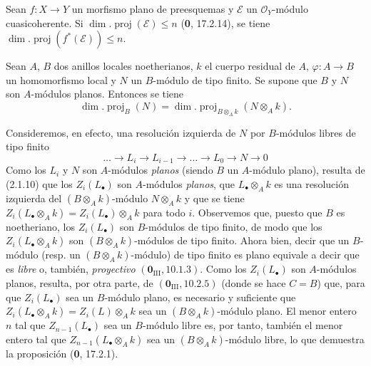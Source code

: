 \begin{corollary}[6.2.2]
\label{IV.2.s6.2.2-fr}
Sean $f:X\to Y$ un morfismo plano de preesquemas y $\mathscr E$ un
$\mathcal O_Y$-módulo cuasicoherente. Si
$\dim.\operatorname{proj}(\mathscr E)\leq n$ \textup{(\textbf{0}, 17.2.14)}, se tiene
$\dim.\operatorname{proj}(f^*(\mathscr E))\leq n$.
\end{corollary}


\begin{proposition}[6.2.3]
Sean $A$, $B$ dos anillos locales noetherianos, $k$ el cuerpo residual de
$A$, $\varphi:A\to B$ un homomorfismo local y $N$ un $B$-módulo de tipo finito.
Se supone que $B$ y $N$ son $A$-módulos planos. Entonces se tiene
\begin{equation}
\dim.\operatorname{proj}_B(N)
=\dim.\operatorname{proj}_{B\otimes_Ak}(N\otimes_Ak).
\tag{6.2.3.1}\label{IV.2.s6.2.3.1-fr}
\end{equation}
\end{proposition}

Consideremos, en efecto, una resolución izquierda de $N$ por $B$-módulos
libres de tipo finito
\[
\ldots\to L_i\to L_{i-1}\to\ldots\to L_0\to N\to0
\]
Como los $L_i$ y $N$ son $A$-módulos \emph{planos} (siendo $B$ un $A$-módulo
plano), resulta de (2.1.10) que los $Z_i(L_\bullet)$ son $A$-módulos
\emph{planos}, que $L_\bullet\otimes_Ak$ es una resolución izquierda del
$(B\otimes_Ak)$-módulo $N\otimes_Ak$ y que se tiene
$Z_i(L_\bullet\otimes_Ak)=Z_i(L_\bullet)\otimes_Ak$ para todo $i$. Observemos
que, puesto que $B$ es noetheriano, los $Z_i(L_\bullet)$ son $B$-módulos de
tipo finito, de modo que los $Z_i(L_\bullet\otimes_Ak)$ son
$(B\otimes_Ak)$-módulos de tipo finito. Ahora bien, decir que un $B$-módulo
(resp. un $(B\otimes_Ak)$-módulo) de tipo finito es plano equivale a decir que
es \emph{libre} o, también, \emph{proyectivo} $(\mathbf{0}_{\mathrm{III}}, 10.1.3)$. Como los
$Z_i(L_\bullet)$ son $A$-módulos planos, resulta, por otra parte, de
$(\mathbf{0}_{\mathrm{III}}, 10.2.5)$ (donde se hace $C=B$) que, para que
$Z_i(L_\bullet)$ sea un $B$-módulo plano, es necesario y suficiente que
$Z_i(L_\bullet\otimes_Ak)=Z_i(L)\otimes_Ak$ sea un $(B\otimes_Ak)$-módulo plano. El menor
entero $n$ tal que $Z_{n-1}(L_\bullet)$ sea un $B$-módulo libre es, por tanto,
también el menor entero tal que $Z_{n-1}(L_\bullet\otimes_Ak)$ sea un
$(B\otimes_Ak)$-módulo libre, lo que demuestra la proposición (\textbf 0, 17.2.1).
